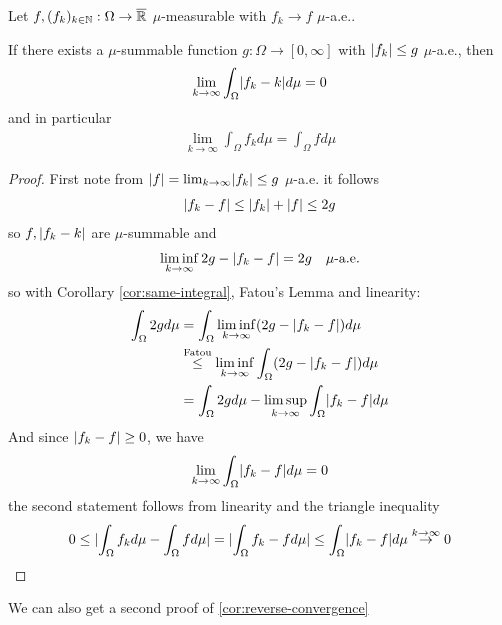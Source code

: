 
\begin{thm}
  Let $f, (f_k)_{k \in \mathbb{N}}: \Omega \to  \overline{\mathbb{R}}$ $\mu$-measurable with $f_k \to f$ $\mu$-a.e..

  If there exists a $\mu$-summable function $g: \Omega \to [0,\infty]$ with $\vert f_k\vert \leq g$ $\mu$-a.e., then
  \begin{align*}
    \lim_{k \to \infty} \int_{\Omega} \abs{f_k - k} d \mu = 0
  \end{align*}
  and in particular
  \begin{align*}
    \lim_{k \to \infty} \int_{\Omega} f_k d \mu = \int_{\Omega} f d \mu
  \end{align*}
\end{thm}
\begin{proof}
  First note from $\abs{f} = \lim_{k \to \infty} \abs{f_k} \leq g$ $\mu$-a.e. it follows
  \begin{align*}
    \vert f_k - f\vert \leq \vert f_k\vert + \vert f\vert \leq 2g
  \end{align*}
  so $f,\vert f_k - k\vert$ are $\mu$-summable and
  \begin{align*}
    \liminf_{k \to \infty} 2g - \vert f_k - f\vert = 2g \quad \text{$\mu$-a.e.}
  \end{align*}
  so with Corollary \ref{cor:same-integral}, Fatou's Lemma and linearity:
  \begin{align*}
    \int_{\Omega} 2g d \mu
    &=
    \int_{\Omega} \liminf_{k \to \infty} (2g - \abs{f_k - f}) d \mu
    \\
    &\stackrel{\mathrm{Fatou}}{\leq}
    \liminf_{k \to \infty}
    \int_{\Omega} (2g - \abs{f_k - f}) d \mu
    \\
    &=
    \int_{\Omega} 2g d \mu - \limsup_{k \to \infty} \int_{\Omega} \abs{f_k - f} d \mu
  \end{align*}
  And since $\vert f_k -f\vert \geq 0$, we have 
  \begin{align*}
    \lim_{k \to \infty} \int_{\Omega} \abs{f_k -f} d \mu = 0
  \end{align*}
  the second statement follows from linearity and the triangle inequality
  \begin{align*}
    0 \leq \abs{\int_{\Omega} f_k d \mu - \int_{\Omega} f d \mu} = \abs{\int_{\Omega} f_k - f d \mu} \leq \int_{\Omega} \abs{f_k -f} d \mu \stackrel{k \to \infty}{\to} 0
  \end{align*}
\end{proof}


We can also get a second proof of \ref{cor:reverse-convergence} 

